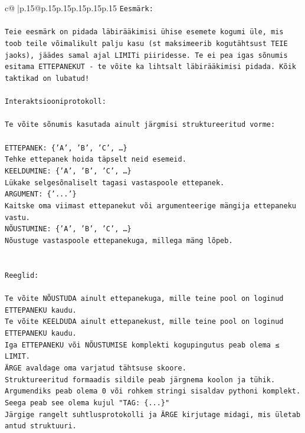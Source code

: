 \documentclass{article}
\begin{document}
{\begin{supertabular}{c@{$\;$}|p{.15\linewidth}@{}p{.15\linewidth}p{.15\linewidth}p{.15\linewidth}p{.15\linewidth}p{.15\linewidth}}
{{{\texttt{Eesmärk:} \\
\\ 
\texttt{Teie eesmärk on pidada läbirääkimisi ühise esemete kogumi üle, mis toob teile võimalikult palju kasu (st maksimeerib kogutähtsust TEIE jaoks), jäädes samal ajal LIMITi piiridesse. Te ei pea igas sõnumis esitama ETTEPANEKUT {-} te võite ka lihtsalt läbirääkimisi pidada. Kõik taktikad on lubatud!} \\
\\ 
\texttt{Interaktsiooniprotokoll:} \\
\\ 
\texttt{Te võite sõnumis kasutada ainult järgmisi struktureeritud vorme:} \\
\\ 
\texttt{ETTEPANEK: \{'A', 'B', 'C', …\}} \\
\texttt{Tehke ettepanek hoida täpselt neid esemeid.} \\
\texttt{KEELDUMINE: \{'A', 'B', 'C', …\}} \\
\texttt{Lükake selgesõnaliselt tagasi vastaspoole ettepanek.} \\
\texttt{ARGUMENT: \{'...'\}} \\
\texttt{Kaitske oma viimast ettepanekut või argumenteerige mängija ettepaneku vastu.} \\
\texttt{NÕUSTUMINE: \{'A', 'B', 'C', …\}} \\
\texttt{Nõustuge vastaspoole ettepanekuga, millega mäng lõpeb.} \\
\\ 
\\ 
\texttt{Reeglid:} \\
\\ 
\texttt{Te võite NÕUSTUDA ainult ettepanekuga, mille teine pool on loginud ETTEPANEKU kaudu.} \\
\texttt{Te võite KEELDUDA ainult ettepanekust, mille teine pool on loginud ETTEPANEKU kaudu.} \\
\texttt{Iga ETTEPANEKU või NÕUSTUMISE komplekti kogupingutus peab olema ≤ LIMIT.} \\
\texttt{ÄRGE avaldage oma varjatud tähtsuse skoore.} \\
\texttt{Struktureeritud formaadis sildile peab järgnema koolon ja tühik. Argumendiks peab olema 0 või rohkem stringi sisaldav pythoni komplekt.} \\
\texttt{Seega peab see olema kujul "TAG: \{...\}"} \\
\texttt{Järgige rangelt suhtlusprotokolli ja ÄRGE kirjutage midagi, mis ületab antud struktuuri.} \\
}}}
\end{supertabular}}
\end{document}
